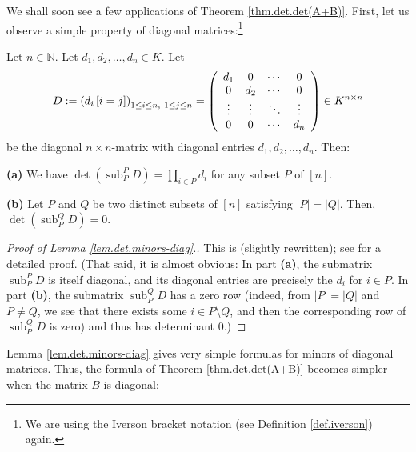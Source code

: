 We shall soon see a few applications of Theorem \ref{thm.det.det(A+B)}. First,
let us observe a simple property of diagonal matrices:\footnote{We are using
the Iverson bracket notation (see Definition \ref{def.iverson}) again.}

\begin{lemma}
\label{lem.det.minors-diag}Let $n\in\mathbb{N}$. Let $d_{1},d_{2},\ldots
,d_{n}\in K$. Let%
\[
D:=\left(  d_{i}\left[  i=j\right]  \right)  _{1\leq i\leq n,\ 1\leq j\leq
n}=\left(
\begin{array}
[c]{cccc}%
d_{1} & 0 & \cdots & 0\\
0 & d_{2} & \cdots & 0\\
\vdots & \vdots & \ddots & \vdots\\
0 & 0 & \cdots & d_{n}%
\end{array}
\right)  \in K^{n\times n}%
\]
be the diagonal $n\times n$-matrix with diagonal entries $d_{1},d_{2}%
,\ldots,d_{n}$. Then: \medskip

\textbf{(a)} We have $\det\left(  \operatorname*{sub}\nolimits_{P}%
^{P}D\right)  =\prod_{i\in P}d_{i}$ for any subset $P$ of $\left[  n\right]
$. \medskip

\textbf{(b)} Let $P$ and $Q$ be two distinct subsets of $\left[  n\right]  $
satisfying $\left\vert P\right\vert =\left\vert Q\right\vert $. Then,
$\det\left(  \operatorname*{sub}\nolimits_{P}^{Q}D\right)  =0$.
\end{lemma}

\begin{proof}
[Proof of Lemma \ref{lem.det.minors-diag}.]This is \cite[Lemma 6.163]%
{detnotes} (slightly rewritten); see \cite[Exercise 6.49]{detnotes} for a
detailed proof. (That said, it is almost obvious: In part \textbf{(a)}, the
submatrix $\operatorname*{sub}\nolimits_{P}^{P}D$ is itself diagonal, and its
diagonal entries are precisely the $d_{i}$ for $i\in P$. In part \textbf{(b)},
the submatrix $\operatorname*{sub}\nolimits_{P}^{Q}D$ has a zero row (indeed,
from $\left\vert P\right\vert =\left\vert Q\right\vert $ and $P\neq Q$, we see
that there exists some $i\in P\setminus Q$, and then the corresponding row of
$\operatorname*{sub}\nolimits_{P}^{Q}D$ is zero) and thus has determinant $0$.)
\end{proof}

Lemma \ref{lem.det.minors-diag} gives very simple formulas for minors of
diagonal matrices. Thus, the formula of Theorem \ref{thm.det.det(A+B)} becomes
simpler when the matrix $B$ is diagonal:


